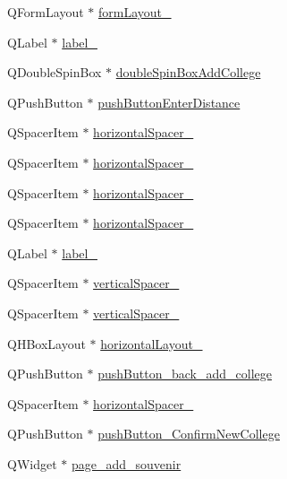 \begin{DoxyCompactItemize}
Q\+Form\+Layout $\ast$ \hyperlink{class_ui___main_window_a092c147f6b1a416795623aa506100c69}{form\+Layout\+\_}
\item 
Q\+Label $\ast$ \hyperlink{class_ui___main_window_a40eea22fe5c81f370b7464d2e962fe8d}{label\+\_}
\item 
Q\+Double\+Spin\+Box $\ast$ \hyperlink{class_ui___main_window_a3890d1b400269fe30a467212a9925c2c}{double\+Spin\+Box\+Add\+College}
\item 
Q\+Push\+Button $\ast$ \hyperlink{class_ui___main_window_a95a025b15a1452935dbd0e65e7505f2e}{push\+Button\+Enter\+Distance}
\item 
Q\+Spacer\+Item $\ast$ \hyperlink{class_ui___main_window_a734635936027a1eac3b9e2e7940191db}{horizontal\+Spacer\+\_}
\item 
Q\+Spacer\+Item $\ast$ \hyperlink{class_ui___main_window_a770dac569d5506f0aa3795ca1ab5b206}{horizontal\+Spacer\+\_}
\item 
Q\+Spacer\+Item $\ast$ \hyperlink{class_ui___main_window_a25ed8085a1b3ec728e0a78baaad35fb5}{horizontal\+Spacer\+\_}
\item 
Q\+Spacer\+Item $\ast$ \hyperlink{class_ui___main_window_aec450a9fd9e07f05d1a655943e3a4d0d}{horizontal\+Spacer\+\_}
\item 
Q\+Label $\ast$ \hyperlink{class_ui___main_window_ad8951142a7b5408cf5f0f3b10c79a1a4}{label\+\_}
\item 
Q\+Spacer\+Item $\ast$ \hyperlink{class_ui___main_window_a20c337f0d051676391fe6dcd815d8085}{vertical\+Spacer\+\_}
\item 
Q\+Spacer\+Item $\ast$ \hyperlink{class_ui___main_window_a50eec212d436efde68119cc48a686f14}{vertical\+Spacer\+\_}
\item 
Q\+H\+Box\+Layout $\ast$ \hyperlink{class_ui___main_window_aad6ee010f1f381e74d982e42b7bc32c9}{horizontal\+Layout\+\_}
\item 
Q\+Push\+Button $\ast$ \hyperlink{class_ui___main_window_abccd9e4f91274df4a339b2bd7aa6b9e9}{push\+Button\+\_\+back\+\_\+add\+\_\+college}
\item 
Q\+Spacer\+Item $\ast$ \hyperlink{class_ui___main_window_a520ac4176ab47577f158006d2dde0ab8}{horizontal\+Spacer\+\_}
\item 
Q\+Push\+Button $\ast$ \hyperlink{class_ui___main_window_a71bdf397280efac86b545cbc1452a524}{push\+Button\+\_\+\+Confirm\+New\+College}
\item 
Q\+Widget $\ast$ \hyperlink{class_ui___main_window_adbc06647c5eb5b4544c4727da4c01014}{page\+\_\+add\+\_\+souvenir}

\end{DoxyCompactItemize}
